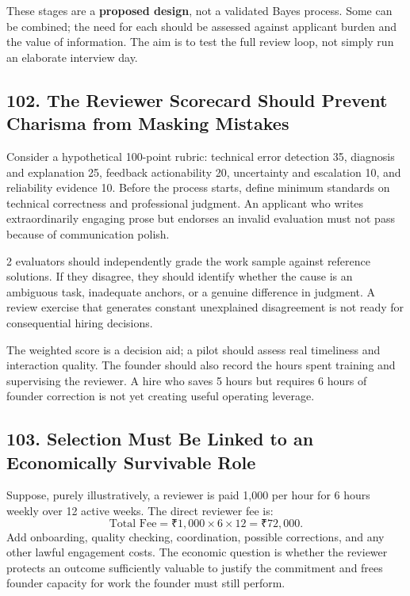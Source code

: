 These stages are a \textbf{proposed design}, not a validated Bayes process. Some can be combined; the need for each should be assessed against applicant burden and the value of information. The aim is to test the full review loop, not simply run an elaborate interview day.

\subsection*{102. The Reviewer Scorecard Should Prevent Charisma from Masking Mistakes}

Consider a hypothetical 100-point rubric: technical error detection 35, diagnosis and explanation 25, feedback actionability 20, uncertainty and escalation 10, and reliability evidence 10. Before the process starts, define minimum standards on technical correctness and professional judgment. An applicant who writes extraordinarily engaging prose but endorses an invalid evaluation must not pass because of communication polish.

2 evaluators should independently grade the work sample against reference solutions. If they disagree, they should identify whether the cause is an ambiguous task, inadequate anchors, or a genuine difference in judgment. A review exercise that generates constant unexplained disagreement is not ready for consequential hiring decisions.

The weighted score is a decision aid; a pilot should assess real timeliness and interaction quality. The founder should also record the hours spent training and supervising the reviewer. A hire who saves 5 hours but requires 6 hours of founder correction is not yet creating useful operating leverage.

\subsection*{103. Selection Must Be Linked to an Economically Survivable Role}

Suppose, purely illustratively, a reviewer is paid 1,000 per hour for 6 hours weekly over 12 active weeks. The direct reviewer fee is:
\begin{equation}
\text{Total Fee} = \text{₹}1,000 \times 6 \times 12 = \text{₹}72,000.
\end{equation}
Add onboarding, quality checking, coordination, possible corrections, and any other lawful engagement costs. The economic question is whether the reviewer protects an outcome sufficiently valuable to justify the commitment and frees founder capacity for work the founder must still perform.


